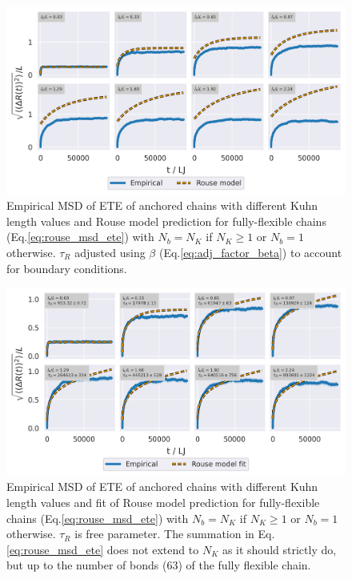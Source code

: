\documentclass[
    paper=A4,pagesize=automedia,fontsize=12pt,
    BCOR=15mm,DIV=22,
    twoside,headinclude,footinclude=false,
    fleqn,             %
    bibliography=totocnumbered,          %
    listof=totoc,                %
    listof=flat,                 %
    cleardoublepage=empty      %
    numbers=endperiod
]{scrartcl}
\begin{document}
\begin{figure}
    \begin{center}
      \includegraphics[width=\columnwidth,trim={0cm 0cm 0cm 0.0cm},clip]{4-exp-delta_R-rouse_anal.png}
      \caption{\label{fig:msd_anchored_l_K_rouse_fit_anal}
      Empirical MSD of ETE of anchored chains with different Kuhn length values
      and Rouse model prediction for fully-flexible chains (Eq.\ref{eq:rouse_msd_ete})
      with $N_b = N_K$ if $N_K \ge 1$ or $N_b=1$ otherwise. $\tau_R$ adjusted
      using $\beta$ (Eq.\ref{eq:adj_factor_beta}) to account for boundary conditions.
      }
    \end{center}
\end{figure}
\begin{figure}
    \begin{center}
      \includegraphics[width=\columnwidth,trim={0cm 0cm 0cm 0.0cm},clip]{4-exp-delta_R-rouse_fit-tau.png}
      \caption{\label{fig:msd_anchored_l_K_rouse_fit-tau}
      Empirical MSD of ETE of anchored chains with different Kuhn length values
      and fit of Rouse model prediction for fully-flexible chains 
      (Eq.\ref{eq:rouse_msd_ete}) with $N_b = N_K$ if $N_K \ge 1$ or $N_b=1$ otherwise.
      $\tau_R$ is free parameter. The summation in Eq.\ref{eq:rouse_msd_ete}
      does not extend to $N_K$ as it should strictly do, but up to the number of bonds (63)
      of the fully flexible chain.
      }
    \end{center}
\end{figure}
\end{document}
